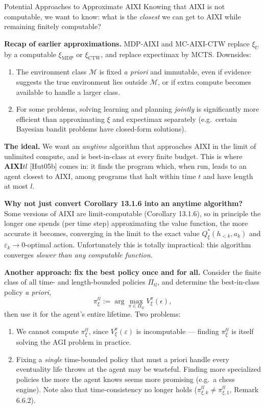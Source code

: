 \documentclass[aspectratio=169,10pt]{beamer}
\begin{document}
\begin{frame}[allowframebreaks]{Potential Approaches to Approximate AIXI}
  Knowing that AIXI is not computable, we want to know: what is the
  \emph{closest} we can get to AIXI while remaining finitely computable?

  \bigskip
  \textbf{Recap of earlier approximations.} MDP-AIXI and MC-AIXI-CTW replace
  $\xi_U$ by a computable $\xi_{\mathrm{MDP}}$ or $\xi_{\mathrm{CTW}}$, and
  replace expectimax by MCTS. Downsides:
  \begin{enumerate}
    \item[(i)] The environment class $\mathcal{M}$ is fixed \emph{a priori}
      and immutable, even if evidence suggests the true environment lies
      outside $\mathcal{M}$, or if extra compute becomes available to handle
      a larger class.
    \item[(ii)] For some problems, solving learning and planning
      \emph{jointly} is significantly more efficient than approximating
      $\xi$ and expectimax separately (e.g.\ certain Bayesian bandit
      problems have closed-form solutions).
  \end{enumerate}

  \bigskip
  \textbf{The ideal.} We want an \emph{anytime} algorithm that approaches
  AIXI in the limit of unlimited compute, and is best-in-class at every
  finite budget. This is where \textbf{AIXI$tl$} [Hut05b] comes in: it finds
  the program which, when run, leads to an agent closest to AIXI, among
  programs that halt within time $t$ and have length at most $l$.

  \framebreak

  \textbf{Why not just convert Corollary 13.1.6 into an anytime algorithm?}
  Some versions of AIXI are limit-computable (Corollary 13.1.6), so in
  principle the longer one spends (per time step) approximating the value
  function, the more accurate it becomes, converging in the limit to the
  exact value $Q_\xi^*(h_{<k},a_k)$ and $\varepsilon_k\to0$-optimal action.
  Unfortunately this is totally impractical: this algorithm converges
  \emph{slower than any computable function}.

  \bigskip
  \textbf{Another approach: fix the best policy once and for all.} Consider
  the finite class of all time- and length-bounded policies
  $\Pi_{tl}$, and determine the best-in-class policy \emph{a priori},
  $$\pi_\xi^{tl} := \arg\max_{\pi\in\Pi_{tl}} V_\xi^\pi(\epsilon),$$
  then use it for the agent's entire lifetime. Two problems:
  \begin{enumerate}
    \item[(i)] We cannot compute $\pi_\xi^{tl}$, since $V_\xi^\pi(\varepsilon)$
      is incomputable --- finding $\pi_\xi^{tl}$ is itself solving the AGI
      problem in practice.
    \item[(ii)] Fixing a \emph{single} time-bounded policy that must a priori
      handle every eventuality life throws at the agent may be wasteful.
      Finding more specialized policies the more the agent knows seems more
      promising (e.g.\ a chess engine). Note also that time-consistency no
      longer holds ($\pi_{\xi,k}^{tl}\ne\pi_{\xi,1}^{tl}$, Remark 6.6.2).
  \end{enumerate}


\end{frame}
\end{document}
